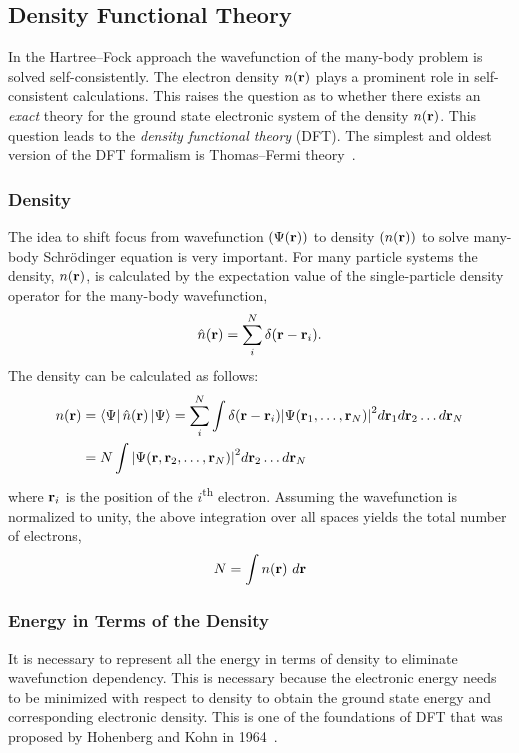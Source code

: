 \subsection{Density Functional Theory}
In the Hartree--Fock approach the wavefunction of the many-body problem is solved self-consistently. The electron density $n(\vb{r})$ plays a prominent role in self-consistent calculations. This raises the question as to whether there exists an \textit{exact} theory for the ground state electronic system of the density $n(\vb{r})$. This question leads to the \textit{density functional \mbox{theory}} (DFT). The simplest and oldest version of the DFT formalism is Thomas--Fermi theory~\cite{thomas1927calculation,fermi1927metodo}.

\subsubsection{Density}
The idea to shift focus from wavefunction $(\Psi(\vb{r}))$ to density $(n(\vb{r}))$ to solve many-body Schr\"odinger equation is very important. For many particle systems the density, $n(\vb{r})$, is calculated by the expectation value of the single-particle density operator for the many-body wavefunction,
\begin{equation}
\hat{n}(\vb{r}) = \sum_i^N \delta(\vb{r} - \vb{r}_i).
\end{equation}
The density can be calculated as follows:
\begin{align}\label{deneqn}
\begin{split}
n(\vb{r}) & = \bra{\Psi}\hat{n}(\vb{r})\ket{\Psi} = \sum_i^N \int \delta(\vb{r}- \vb{r}_i) \abs{\Psi(\vb{r}_1,\dots,\vb{r}_N)}^2 d\vb{r}_1 d\vb{r}_2 \dots d\vb{r}_N\\
    & = N \int \abs{\Psi(\vb{r},\vb{r}_2,\dots,\vb{r}_N)}^2  d\vb{r}_2 \dots d\vb{r}_N
\end{split}
\end{align}
where $\vb{r}_i$ is the position of the $i$\textsuperscript{th} electron. Assuming the wavefunction is normalized to unity, the above integration over all spaces yields the total number of electrons,
\begin{equation}
	N = \int n(\vb{r})\ d\vb{r}
\end{equation} 


\subsubsection{Energy in Terms of the Density}
It is necessary to represent all the energy in terms of density to eliminate wavefunction dependency. This is necessary because the electronic energy needs to be minimized with respect to density to obtain the ground state energy and corresponding electronic density. This is one of the foundations of DFT that was proposed by Hohenberg and Kohn in 1964~\cite{hohenberg1964inhomogeneous}.

